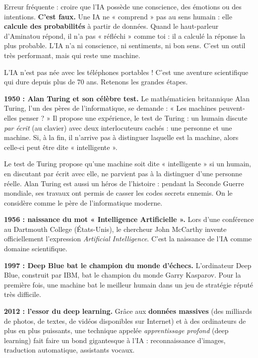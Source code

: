 \documentclass[11pt]{article}
\newcommand{\cle}[1]{{\popxbold\color{popdark}#1}}
\newcounter{popsec}
\newcounter{popsub}
\newcommand{\courssub}[1]{%
  \stepcounter{popsub}%
  \par\vspace{9pt}\noindent{\popxbold\fontsize{11.5}{13}\selectfont\color{popink}{\color{poporange}\thepopsec.\thepopsub}\hspace{6pt}#1}\par\nopagebreak\vspace{4pt}
}
\begin{document}
\begin{attention}
Erreur fréquente : croire que l'IA possède une conscience, des émotions ou des intentions. \textbf{C'est faux.} Une IA ne « comprend » pas au sens humain : elle \textbf{calcule des probabilités} à partir de données. Quand le haut-parleur d'Aminatou répond, il n'a pas « réfléchi » comme toi : il a calculé la réponse la plus probable. L'IA n'a ni conscience, ni sentiments, ni bon sens. C'est un outil très performant, mais qui reste une machine.
\end{attention}

\courssub{Une brève histoire de l'IA}

L'IA n'est pas née avec les téléphones portables ! C'est une aventure scientifique qui dure depuis plus de 70 ans. Retenons les grandes étapes.

\textbf{1950 : Alan Turing et son célèbre test.} Le mathématicien britannique \cle{Alan Turing}, l'un des pères de l'informatique, se demande : « Les machines peuvent-elles penser ? » Il propose une expérience, le \cle{test de Turing} : un humain discute \emph{par écrit} (au clavier) avec deux interlocuteurs cachés : une personne et une machine. Si, à la fin, il n'arrive pas à distinguer laquelle est la machine, alors celle-ci peut être dite « intelligente ».

\begin{savaistu}
Le test de Turing propose qu'une machine soit dite « intelligente » si un humain, en discutant par écrit avec elle, ne parvient pas à la distinguer d'une personne réelle. Alan Turing est aussi un héros de l'histoire : pendant la Seconde Guerre mondiale, ses travaux ont permis de casser les codes secrets ennemis. On le considère comme le père de l'informatique moderne.
\end{savaistu}

\textbf{1956 : naissance du mot « Intelligence Artificielle ».} Lors d'une conférence au Dartmouth College (États-Unis), le chercheur John McCarthy invente officiellement l'expression \emph{Artificial Intelligence}. C'est la naissance de l'IA comme domaine scientifique.

\textbf{1997 : Deep Blue bat le champion du monde d'échecs.} L'ordinateur Deep Blue, construit par IBM, bat le champion du monde Garry Kasparov. Pour la première fois, une machine bat le meilleur humain dans un jeu de stratégie réputé très difficile.

\textbf{2012 : l'essor du deep learning.} Grâce aux \textbf{données massives} (des milliards de photos, de textes, de vidéos disponibles sur Internet) et à des ordinateurs de plus en plus puissants, une technique appelée \emph{apprentissage profond} (deep learning) fait faire un bond gigantesque à l'IA : reconnaissance d'images, traduction automatique, assistants vocaux.
\end{document}
